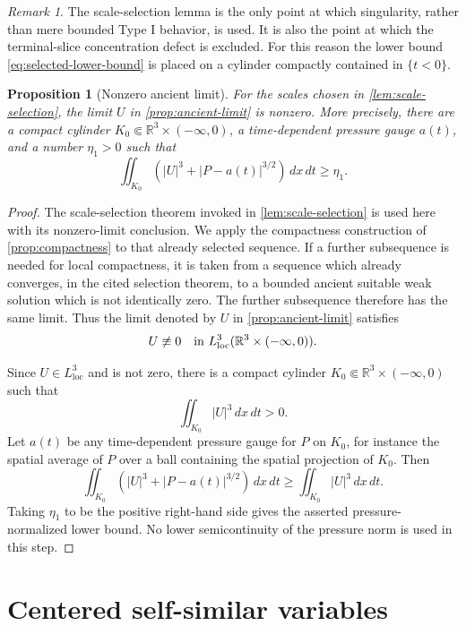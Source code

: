 \documentclass[11pt]{amsart}
\theoremstyle{plain}
\newtheorem{proposition}[theorem]{Proposition}
\theoremstyle{definition}
\theoremstyle{remark}
\newtheorem{remark}[theorem]{Remark}
\numberwithin{equation}{section}
\newcommand{\R}{\mathbb R}
\newcommand{\loc}{\mathrm{loc}}
\begin{document}
\begin{remark}\label{rem:selection}
The scale-selection lemma is the only point at which singularity, rather than
mere bounded Type I behavior, is used.  It is also the point at which the
terminal-slice concentration defect is excluded.  For this reason the lower
bound \eqref{eq:selected-lower-bound} is placed on a cylinder compactly
contained in \(\{t<0\}\).
\end{remark}

\begin{proposition}[Nonzero ancient limit]\label{prop:nonzero}
For the scales chosen in \cref{lem:scale-selection}, the limit \(U\) in
\cref{prop:ancient-limit} is nonzero.  More precisely, there are a compact
cylinder \(K_0\Subset\R^3\times(-\infty,0)\), a time-dependent pressure gauge
\(a(t)\), and a number \(\eta_1>0\) such that
\[
   \iint_{K_0}\left(|U|^3+|P-a(t)|^{3/2}\right)\,dx\,dt\ge \eta_1 .
\]
\end{proposition}

\begin{proof}
The scale-selection theorem invoked in \cref{lem:scale-selection} is used here
with its nonzero-limit conclusion.  We apply the compactness construction of
\cref{prop:compactness} to that already selected sequence.  If a further
subsequence is needed for local compactness, it is taken from a sequence which
already converges, in the cited selection theorem, to a bounded ancient
suitable weak solution which is not identically zero.  The further subsequence
therefore has the same limit.  Thus the limit denoted by \(U\) in
\cref{prop:ancient-limit} satisfies
\[
   U\not\equiv0
   \quad\hbox{in }L^3_{\loc}(\R^3\times(-\infty,0)).
\]

Since \(U\in L^3_{\loc}\) and is not zero, there is a compact cylinder
\(K_0\Subset\R^3\times(-\infty,0)\) such that
\[
   \iint_{K_0}|U|^3\,dx\,dt>0 .
\]
Let \(a(t)\) be any time-dependent pressure gauge for \(P\) on \(K_0\), for
instance the spatial average of \(P\) over a ball containing the spatial
projection of \(K_0\).  Then
\[
   \iint_{K_0}\left(|U|^3+|P-a(t)|^{3/2}\right)\,dx\,dt
   \ge
   \iint_{K_0}|U|^3\,dx\,dt .
\]
Taking \(\eta_1\) to be the positive right-hand side gives the asserted
pressure-normalized lower bound.  No lower semicontinuity of the pressure norm
is used in this step.
\end{proof}

\section{Centered self-similar variables}\label{sec:renorm}
\end{document}
